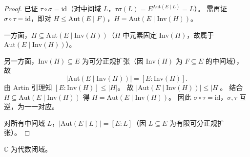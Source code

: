 \documentclass[lang=cn,a4paper,newtx]{elegantbook}
\begin{document}
\begin{proof}
  已证 $\tau\circ\sigma=\mathrm{id}$（对中间域 $L$，$\tau\sigma(L)=E^{\mathrm{Aut}(E\mid L)}=L$）。
  需再证 $\sigma\circ\tau=\mathrm{id}$，即对 $H\le\mathrm{Aut}(E\mid F)$，$H=\mathrm{Aut}(E\mid\mathrm{Inv}(H))$。

  一方面，$H\subseteq\mathrm{Aut}(E\mid\mathrm{Inv}(H))$（$H$ 中元素固定 $\mathrm{Inv}(H)$，故属于 $\mathrm{Aut}(E\mid\mathrm{Inv}(H))$）。

  另一方面，$\mathrm{Inv}(H)\subseteq E$ 为可分正规扩张（因 $\mathrm{Inv}(H)$ 为 $F\subseteq E$ 的中间域），故
  \[
    |\mathrm{Aut}(E\mid\mathrm{Inv}(H))|=[E:\mathrm{Inv}(H)].
  \]
  由 Artin 引理知 $[E:\mathrm{Inv}(H)]\le|H|$。
  故 $|\mathrm{Aut}(E\mid\mathrm{Inv}(H))|\le|H|$。
  结合 $H\subseteq\mathrm{Aut}(E\mid\mathrm{Inv}(H))$ 得 $H=\mathrm{Aut}(E\mid\mathrm{Inv}(H))$。
  因此 $\sigma\circ\tau=\mathrm{id}$，$\sigma,\tau$ 互逆，为一一对应。

  对所有中间域 $L$，$|\mathrm{Aut}(E\mid L)|=[E:L]$（因 $L\subseteq E$ 为有限可分正规扩张）。
\end{proof}

\begin{theorem}[代数基本定理]
  $\mathbb{C}$ 为代数闭域。
\end{theorem}
\end{document}
